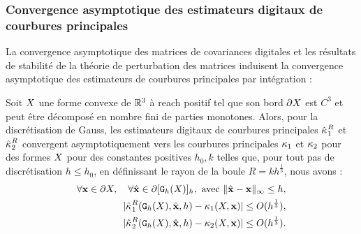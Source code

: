\subsubsection{Convergence asymptotique des estimateurs digitaux de courbures principales}
%
La convergence asymptotique des matrices de covariances digitales et les
résultats de stabilité de la théorie de perturbation des matrices induisent la
convergence asymptotique des estimateurs de courbures principales par
intégration :
%
\begin{theorem}{}
\label{thm:multigrid-convergence-curv-k1k2}
%
  Soit $X$ une forme convexe de $\mathbb{R}^3$ à reach positif tel que son bord
  $\partial X$ est $C^3$ et peut être décomposé en nombre fini de parties monotones.
  Alors, pour la discrétisation de Gauss, les estimateurs digitaux de courbures
  principales $\hat{\kappa_{}}_{1}^{R}$ et $\hat{\kappa_{}}_{2}^{R}$ convergent
  asymptotiquement vers les courbures principales $\kappa_{1}$ et
  $\kappa_{2}$ pour des formes $X$ pour des constantes positives $h_0,
  k$ telles que, pour tout pas de discrétisation $h \le h_0$, en définissant le
  rayon de la boule $R = kh^{\frac{1}{3}}$, nous avons :
  \begin{align}
     \forall \mathbf{x} \in \partial X, \quad \forall \hat{\mathbf{x}} \in \partial \lbrack \mathtt{G}_{h}(X) \rbrack_{h}, \text{~avec~} \| \hat{\mathbf{x}} -\mathbf{x}\|_\infty \le h,\nonumber\\
     | \hat{\kappa_{}}_{1}^{R}(\mathtt{G}_{h}(X),\hat{\mathbf{x}},h) - \kappa_{1}(X,\mathbf{x}) | \le O(h^{\frac{1}{3}}) ,\\
     | \hat{\kappa_{}}_{2}^{R}(\mathtt{G}_{h}(X),\hat{\mathbf{x}},h) - \kappa_{2}(X,\mathbf{x}) | \le O(h^{\frac{1}{3}}) .
  \end{align}
\end{theorem}
